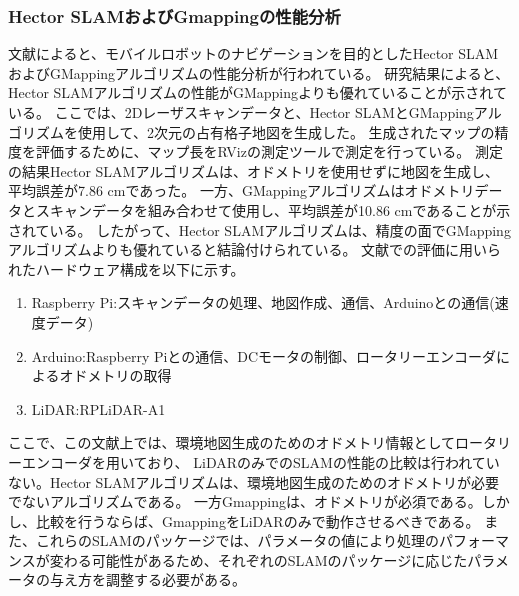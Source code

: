 \subsubsection{Hector SLAMおよびGmappingの性能分析}
文献\cite{slam:comp1}によると、モバイルロボットのナビゲーションを目的としたHector SLAMおよびGMappingアルゴリズムの性能分析が行われている。
研究結果によると、Hector SLAMアルゴリズムの性能がGMappingよりも優れていることが示されている。
ここでは、2Dレーザスキャンデータと、Hector SLAMとGMappingアルゴリズムを使用して、2次元の占有格子地図を生成した。
生成されたマップの精度を評価するために、マップ長をRVizの測定ツールで測定を行っている。
測定の結果Hector SLAMアルゴリズムは、オドメトリを使用せずに地図を生成し、平均誤差が7.86 cmであった。
一方、GMappingアルゴリズムはオドメトリデータとスキャンデータを組み合わせて使用し、平均誤差が10.86 cmであることが示されている。
したがって、Hector SLAMアルゴリズムは、精度の面でGMappingアルゴリズムよりも優れていると結論付けられている。
文献での評価に用いられたハードウェア構成を以下に示す。
\begin{enumerate}
  \item Raspberry Pi:スキャンデータの処理、地図作成、通信、Arduinoとの通信(速度データ)
  \item Arduino:Raspberry Piとの通信、DCモータの制御、ロータリーエンコーダによるオドメトリの取得
  \item LiDAR:RPLiDAR-A1
\end{enumerate}

ここで、この文献上では、環境地図生成のためのオドメトリ情報としてロータリーエンコーダを用いており、
LiDARのみでのSLAMの性能の比較は行われていない。Hector SLAMアルゴリズムは、環境地図生成のためのオドメトリが必要でないアルゴリズムである。
一方Gmappingは、オドメトリが必須である。しかし、比較を行うならば、GmappingをLiDARのみで動作させるべきである。
また、これらのSLAMのパッケージでは、パラメータの値により処理のパフォーマンスが変わる可能性があるため、それぞれのSLAMのパッケージに応じたパラメータの与え方を調整する必要がある。

